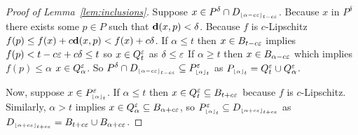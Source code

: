 %

\begin{proof}[Proof of Lemma~\ref{lem:inclusions}]
  Suppose $x\in P^\delta\cap D\subi{t-c\e}{\alpha-c\e}$.
  Because $x$ in $P^\delta$ there exists some $p\in P$ such that $\dist(x,p) < \delta$.
  Because $f$ is $c$-Lipschitz $f(p)\leq f(x) + c\dist(x,p) < f(x) + c\delta$.
  If $\alpha\leq t$ then $x\in B_{t-c\e}$ implies $f(p) < t-c\e + c\delta \leq t$ so $x\in Q_t^\e$ as $\delta\leq\e$
  If $\alpha\geq t$ then $x\in B_{\alpha-c\e}$ which implies $f(p) \leq \alpha$ $x\in Q_\alpha^\e$.
  So $P^\delta\cap D\subi{t-c\e}{\alpha-c\e}\subseteq P\subi{t}{\alpha}^\e$ as $P\subi{t}{\alpha} = Q_t^\e\cup Q_\alpha^\e$.

  Now, suppose $x\in P\subi{t}{\alpha}^\e$.
  If $\alpha\leq t$ then $x\in Q_t^\e\subseteq B_{t+c\e}$ because $f$ is $c$-Lipschitz.
  Similarly, $\alpha > t$ implies $x\in Q_\alpha^\e\subseteq B_{\alpha+c\e}$, so $P\subi{t}{\alpha}^\e\subseteq D\subi{t+c\e}{\alpha+c\e}$ as $D\subi{t+c\e}{\alpha+c\e} = B_{t+c\e}\cup B_{\alpha+c\e}$.
\end{proof}

